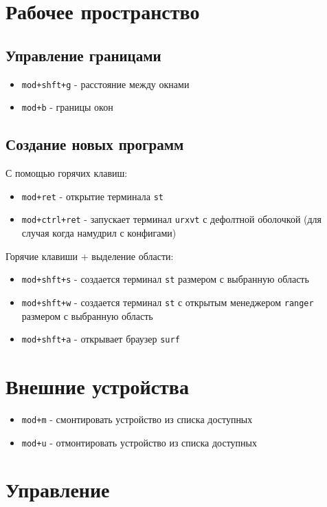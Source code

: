 \documentclass{article}
\begin{document}
\section{Рабочее пространство}
\subsection{Управление границами}
\begin{itemize}
    \item \verb|mod+shft+g| - расстояние между окнами
    \item \verb|mod+b| - границы окон
\end{itemize}


\subsection{Создание новых программ}
С помощью горячих клавиш:
\begin{itemize}
    \item \verb|mod+ret| - открытие терминала \verb|st|
    \item \verb|mod+ctrl+ret| - запускает терминал \verb|urxvt| с
        дефолтной оболочкой (для случая когда намудрил с конфигами)
\end{itemize}

\par Горячие клавиши + выделение области:
\begin{itemize}
    \item \verb|mod+shft+s| - создается терминал \verb|st| размером с
        выбранную область
    \item \verb|mod+shft+w| - создается терминал \verb|st| с открытым
        менеджером \verb|ranger| размером с выбранную область
    \item \verb|mod+shft+a| - открывает браузер \verb|surf|
\end{itemize}

\section{Внешние устройства}
\begin{itemize}
    \item \verb|mod+m| - смонтировать устройство из списка доступных
    \item \verb|mod+u| - отмонтировать устройство из списка доступных
\end{itemize}

\section{Управление}
\end{document}
